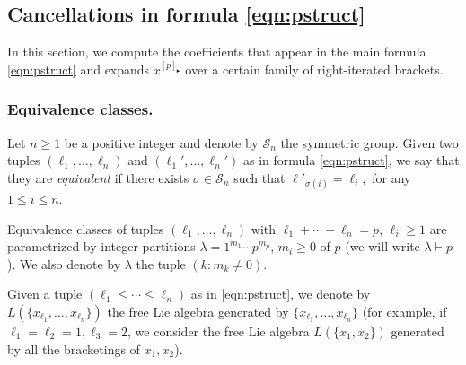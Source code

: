 \documentclass[12pt]{article}
\newcommand{\btr}{\blacktriangleright}
\begin{document}
\subsection{Cancellations in formula \eqref{eqn:pstruct}}
\label{sec:simplifications} In this section, we compute the coefficients that appear in the main formula \eqref{eqn:pstruct} and expands  $x^{[p]_{\btr}}$ over a certain family of right-iterated brackets.


\subsubsection{Equivalence classes.}
Let $n\geq 1$ be a positive integer and denote by $\mathcal{S}_n$ the symmetric group. Given two tuples $(\ell_1,\ldots,\ell_n)$ and $(\ell_1',\ldots,\ell_n')$ as in formula \eqref{eqn:pstruct}, we say that they are \emph{equivalent} if there exists $\sigma\in\mathcal{S}_n$ such that $\ell'_{\sigma(i)}=\ell_i,$ for any $1\leq i\leq n$.


Equivalence classes of tuples $(\ell_1,\ldots,\ell_n)$ with $\ell_1+\cdots+ \ell_n = p$, $\ell_i \geq 1$ are parametrized by integer partitions $\lambda = 1^{m_1}\cdots p^{m_p}$, $m_i \geq 0$  of $p$ (we will write $\lambda\vdash p$). We also denote by $\lambda$ the tuple $(k:m_k\neq 0)$.

Given a tuple $(\ell_1 \leq \cdots \leq \ell_n)$ as in \eqref{eqn:pstruct}, we denote by $L(\{x_{\ell_1},\ldots, x_{\ell_n}\})$ the free Lie algebra generated by $\{x_{\ell_1},\ldots, x_{\ell_n}\}$ (for example, if $\ell_1=\ell_2=1, \ell_3=2$, we consider the free Lie algebra $L(\{x_1,x_2\})$ generated by all the bracketings of $x_{1},x_{2}$). 
\end{document}
